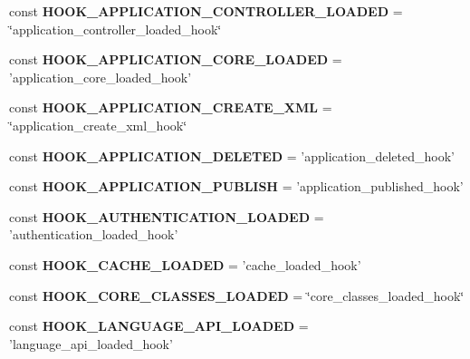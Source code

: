 \begin{DoxyCompactItemize}
\item 
\hypertarget{class_hooks_ad5bb541d77d43a9a58415983e4e839b7}{
const {\bfseries HOOK\_\-APPLICATION\_\-CONTROLLER\_\-LOADED} = \char`\"{}application\_\-controller\_\-loaded\_\-hook\char`\"{}}
\label{class_hooks_ad5bb541d77d43a9a58415983e4e839b7}

\item 
\hypertarget{class_hooks_a58cd011c837a212bfd87fccf21134783}{
const {\bfseries HOOK\_\-APPLICATION\_\-CORE\_\-LOADED} = 'application\_\-core\_\-loaded\_\-hook'}
\label{class_hooks_a58cd011c837a212bfd87fccf21134783}

\item 
\hypertarget{class_hooks_a6073038ff3a34f8f2ba1b2860e83424a}{
const {\bfseries HOOK\_\-APPLICATION\_\-CREATE\_\-XML} = \char`\"{}application\_\-create\_\-xml\_\-hook\char`\"{}}
\label{class_hooks_a6073038ff3a34f8f2ba1b2860e83424a}

\item 
\hypertarget{class_hooks_affc68d23cf90528dd6be8adf4c85f7c8}{
const {\bfseries HOOK\_\-APPLICATION\_\-DELETED} = 'application\_\-deleted\_\-hook'}
\label{class_hooks_affc68d23cf90528dd6be8adf4c85f7c8}

\item 
\hypertarget{class_hooks_a3dbb7ef2737b3aeda0d91f9c4c0a4bed}{
const {\bfseries HOOK\_\-APPLICATION\_\-PUBLISH} = 'application\_\-published\_\-hook'}
\label{class_hooks_a3dbb7ef2737b3aeda0d91f9c4c0a4bed}

\item 
\hypertarget{class_hooks_af618ace2044dea34966c164604426a7b}{
const {\bfseries HOOK\_\-AUTHENTICATION\_\-LOADED} = 'authentication\_\-loaded\_\-hook'}
\label{class_hooks_af618ace2044dea34966c164604426a7b}

\item 
\hypertarget{class_hooks_a637e5aa633b46c90bd4787e490079519}{
const {\bfseries HOOK\_\-CACHE\_\-LOADED} = 'cache\_\-loaded\_\-hook'}
\label{class_hooks_a637e5aa633b46c90bd4787e490079519}

\item 
\hypertarget{class_hooks_a038f05c823d4ae31988a21894d6089d2}{
const {\bfseries HOOK\_\-CORE\_\-CLASSES\_\-LOADED} = \char`\"{}core\_\-classes\_\-loaded\_\-hook\char`\"{}}
\label{class_hooks_a038f05c823d4ae31988a21894d6089d2}

\item 
\hypertarget{class_hooks_a5e82de0a332ee0f68c42ad084f7225ce}{
const {\bfseries HOOK\_\-LANGUAGE\_\-API\_\-LOADED} = 'language\_\-api\_\-loaded\_\-hook'}
\label{class_hooks_a5e82de0a332ee0f68c42ad084f7225ce}


\end{DoxyCompactItemize}
